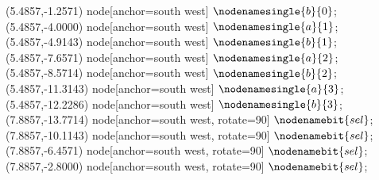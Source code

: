    (5.4857,-1.2571) node[anchor=south west] {$\nodenamesingle{b}{0}$};
   (5.4857,-4.0000) node[anchor=south west] {$\nodenamesingle{a}{1}$};
   (5.4857,-4.9143) node[anchor=south west] {$\nodenamesingle{b}{1}$};
   (5.4857,-7.6571) node[anchor=south west] {$\nodenamesingle{a}{2}$};
   (5.4857,-8.5714) node[anchor=south west] {$\nodenamesingle{b}{2}$};
   (5.4857,-11.3143) node[anchor=south west] {$\nodenamesingle{a}{3}$};
   (5.4857,-12.2286) node[anchor=south west] {$\nodenamesingle{b}{3}$};
   (7.8857,-13.7714) node[anchor=south west, rotate=90] {$\nodenamebit{sel}$};
   (7.8857,-10.1143) node[anchor=south west, rotate=90] {$\nodenamebit{sel}$};
   (7.8857,-6.4571) node[anchor=south west, rotate=90] {$\nodenamebit{sel}$};
   (7.8857,-2.8000) node[anchor=south west, rotate=90] {$\nodenamebit{sel}$};
